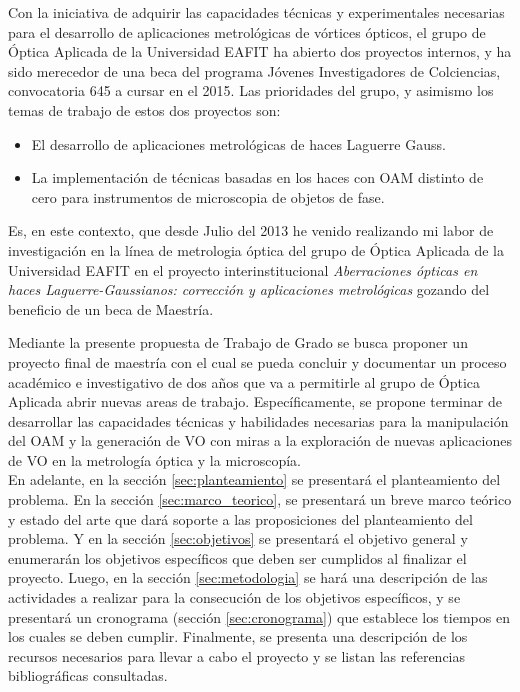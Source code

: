 Con la iniciativa de adquirir las capacidades técnicas y experimentales
necesarias para el desarrollo de aplicaciones metrológicas de vórtices ópticos, el grupo de Óptica
Aplicada de la Universidad EAFIT ha abierto dos proyectos internos, y
ha sido merecedor de una beca del programa Jóvenes Investigadores de Colciencias,
convocatoria 645 a cursar en el 2015.  
Las prioridades del grupo, y asimismo los temas de trabajo de estos
dos proyectos son: 
\begin{itemize}
\item El desarrollo de aplicaciones metrológicas de haces Laguerre
  Gauss. 
\item La implementación de técnicas basadas en los haces con OAM
  distinto de cero para instrumentos de microscopia de objetos de fase. 
\end{itemize}

Es, en este contexto, que desde Julio del 2013 he venido realizando mi labor de
investigación en la línea de metrologia óptica del grupo de Óptica Aplicada de la Universidad EAFIT
en el proyecto interinstitucional  \textit{Aberraciones ópticas en haces Laguerre-Gaussianos: corrección
  y aplicaciones metrológicas} gozando del beneficio de un beca de Maestría. 



Mediante la presente propuesta de Trabajo de Grado se busca proponer
un proyecto final de maestría con el cual se pueda concluir y documentar
un proceso académico e investigativo de dos años que va a permitirle al
grupo de Óptica Aplicada abrir nuevas areas de trabajo. 
Específicamente, se propone terminar de desarrollar las capacidades técnicas y
habilidades necesarias para la manipulación del OAM y la generación de
VO con miras a la exploración de nuevas aplicaciones de VO en la
metrología óptica y la microscopía. \\


En adelante, en la sección \ref{sec:planteamiento} se presentará el
planteamiento del problema. En la sección \ref{sec:marco_teorico}, se presentará  un breve marco
teórico y estado del arte que dará soporte a las proposiciones del planteamiento del problema.
Y en la sección \ref{sec:objetivos} se presentará el objetivo general y enumerarán
los objetivos específicos que deben ser cumplidos al finalizar el
proyecto. Luego, en la sección \ref{sec:metodologia} se hará una descripción de las
actividades a realizar para la consecución de los objetivos
específicos, y se presentará un cronograma (sección \ref{sec:cronograma})  que
establece los tiempos en los cuales se deben cumplir. Finalmente, se
presenta una descripción de los recursos necesarios
para llevar a cabo el proyecto y se listan las referencias
bibliográficas consultadas. 

